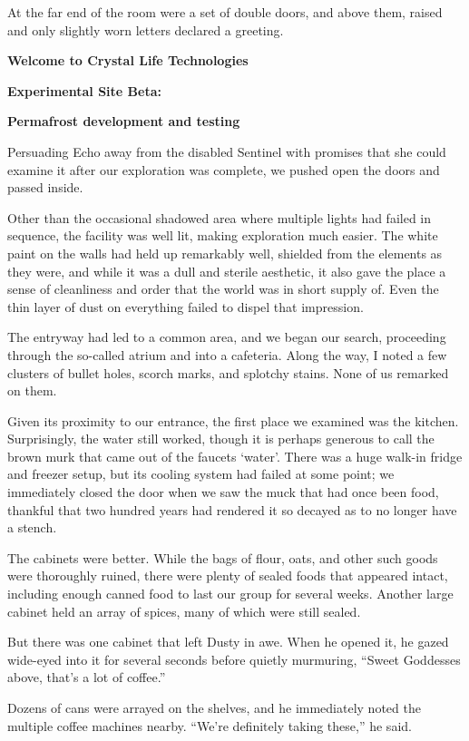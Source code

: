 At the far end of the room were a set of double doors, and above them, raised and only slightly worn letters declared a greeting.

{
\center
\textbf{Welcome to Crystal Life Technologies}

\textbf{Experimental Site Beta:}

\textbf{Permafrost development and testing}

}

Persuading Echo away from the disabled Sentinel with promises that she could examine it after our exploration was complete, we pushed open the doors and passed inside.

Other than the occasional shadowed area where multiple lights had failed in sequence, the facility was well lit, making exploration much easier. The white paint on the walls had held up remarkably well, shielded from the elements as they were, and while it was a dull and sterile aesthetic, it also gave the place a sense of cleanliness and order that the world was in short supply of. Even the thin layer of dust on everything failed to dispel that impression.

The entryway had led to a common area, and we began our search, proceeding through the so-called atrium and into a cafeteria. Along the way, I noted a few clusters of bullet holes, scorch marks, and splotchy stains. None of us remarked on them.

Given its proximity to our entrance, the first place we examined was the kitchen. Surprisingly, the water still worked, though it is perhaps generous to call the brown murk that came out of the faucets ‘water’. There was a huge walk-in fridge and freezer setup, but its cooling system had failed at some point; we immediately closed the door when we saw the muck that had once been food, thankful that two hundred years had rendered it so decayed as to no longer have a stench.

The cabinets were better. While the bags of flour, oats, and other such goods were thoroughly ruined, there were plenty of sealed foods that appeared intact, including enough canned food to last our group for several weeks. Another large cabinet held an array of spices, many of which were still sealed.

But there was one cabinet that left Dusty in awe. When he opened it, he gazed wide-eyed into it for several seconds before quietly murmuring, “Sweet Goddesses above, that’s a lot of coffee.”

Dozens of cans were arrayed on the shelves, and he immediately noted the multiple coffee machines nearby. “We’re definitely taking these,” he said.

